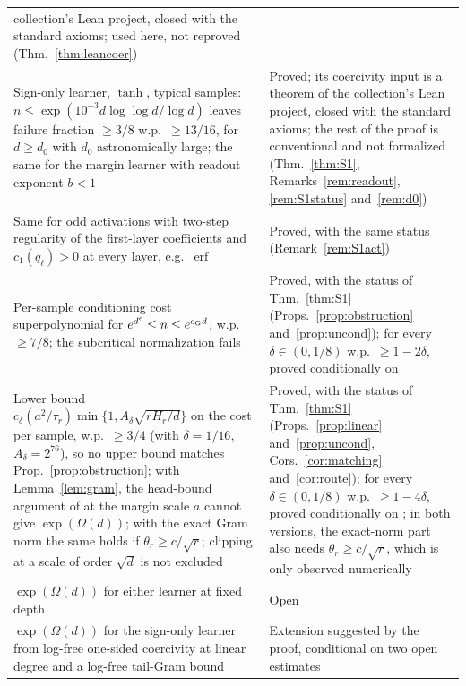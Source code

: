 \documentclass[11pt]{article}
\theoremstyle{definition}\newtheorem{assumption}[theorem]{Assumption}
\theoremstyle{remark}\newtheorem{remark}[theorem]{Remark}
\begin{document}
\begin{longtable}{@{}>{\raggedright\arraybackslash}p{}
 >{\raggedright\arraybackslash}p{}@{}}
collection's Lean project, closed with the standard axioms; used here, not
reproved (Thm.~\ref{thm:leancoer})\\\addlinespace[3pt]
Sign-only learner, $\tanh$, typical samples:
$n\le\exp(10^{-3}d\log\log d/\log d)$ leaves failure fraction $\ge3/8$
w.p.\ $\ge13/16$, for $d\ge d_0$ with $d_0$ astronomically large; the same
for the margin learner with readout exponent $b<1$ & Proved; its
coercivity input is a theorem of the collection's Lean project, closed
with the standard axioms; the rest of the proof is conventional and not
formalized (Thm.~\ref{thm:S1}, Remarks~\ref{rem:readout},
\ref{rem:S1status} and~\ref{rem:d0})\\\addlinespace[3pt]
Same for odd activations with two-step regularity of the first-layer
coefficients and $c_1(q_\ell)>0$ at every layer, e.g.\
$\operatorname{erf}$ & Proved, with the same status
(Remark~\ref{rem:S1act})\\\addlinespace[3pt]
Per-sample conditioning cost superpolynomial for
$e^{d^\epsilon}\le n\le e^{c_{\rm G}d}$, w.p.\ $\ge7/8$; the subcritical
normalization \cite[eq.~(42)]{subcritical} fails & Proved, with the
status of Thm.~\ref{thm:S1} (Props.~\ref{prop:obstruction}
and~\ref{prop:uncond}); for every $\delta\in(0,1/8)$ w.p.\
$\ge1-2\delta$, proved conditionally on
\cite[Lemma~4.1]{subcritical}\\\addlinespace[3pt]
Lower bound $c_\delta(a^2/\tau_r)\min\{1,A_\delta\sqrt{rH_r/d}\}$ on the
cost per sample, w.p.\ $\ge3/4$ (with $\delta=1/16$, $A_\delta=2^{76}$), so
no upper bound matches Prop.~\ref{prop:obstruction}; with
Lemma~\ref{lem:gram}, the head-bound argument of \cite{subcritical} at the
margin scale $a$ cannot give $\exp(\Omega(d))$; with the exact Gram norm
the same holds if $\theta_r\ge c/\sqrt r$; clipping at a scale of order
$\sqrt d$ is not excluded & Proved, with the status of
Thm.~\ref{thm:S1} (Props.~\ref{prop:linear} and~\ref{prop:uncond},
Cors.~\ref{cor:matching} and~\ref{cor:route}); for every
$\delta\in(0,1/8)$ w.p.\ $\ge1-4\delta$, proved conditionally on
\cite[Lemma~4.1]{subcritical}; in both versions, the exact-norm part also
needs $\theta_r\ge c/\sqrt r$, which is only observed
numerically\\\addlinespace[3pt]
$\exp(\Omega(d))$ for either learner at fixed depth & Open\\\addlinespace[3pt]
$\exp(\Omega(d))$ for the sign-only learner from log-free one-sided
coercivity at linear degree and a log-free tail-Gram bound & Extension
suggested by the proof, conditional on two open estimates

\end{longtable}
\end{document}
